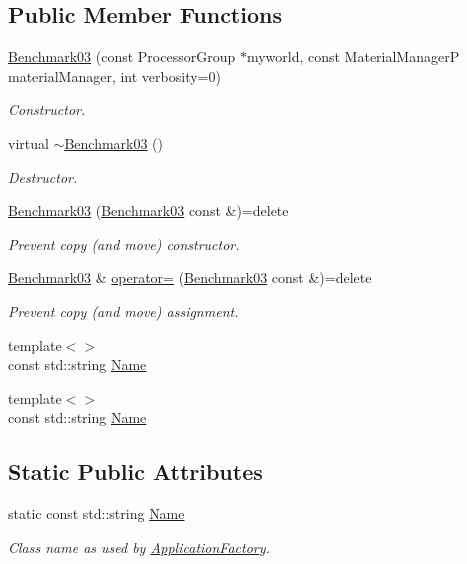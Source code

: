 \subsection*{Public Member Functions}
\begin{DoxyCompactItemize}
\item 
\hyperlink{classUintah_1_1PhaseField_1_1Benchmark03_ad2f44d664d62ff81a6f7ec039d779c35}{Benchmark03} (const Processor\+Group $\ast$myworld, const Material\+ManagerP material\+Manager, int verbosity=0)
\begin{DoxyCompactList}\small\item\em Constructor. \end{DoxyCompactList}\item 
virtual \hyperlink{classUintah_1_1PhaseField_1_1Benchmark03_a9527212bded7f353e9376f278ab9baf4}{$\sim$\+Benchmark03} ()
\begin{DoxyCompactList}\small\item\em Destructor. \end{DoxyCompactList}\item 
\hyperlink{classUintah_1_1PhaseField_1_1Benchmark03_a07e76b7ec2c47efb2cb28dc038720b1a}{Benchmark03} (\hyperlink{classUintah_1_1PhaseField_1_1Benchmark03}{Benchmark03} const \&)=delete
\begin{DoxyCompactList}\small\item\em Prevent copy (and move) constructor. \end{DoxyCompactList}\item 
\hyperlink{classUintah_1_1PhaseField_1_1Benchmark03}{Benchmark03} \& \hyperlink{classUintah_1_1PhaseField_1_1Benchmark03_a737e2ac7671a49af4ea12c684d5c8e63}{operator=} (\hyperlink{classUintah_1_1PhaseField_1_1Benchmark03}{Benchmark03} const \&)=delete
\begin{DoxyCompactList}\small\item\em Prevent copy (and move) assignment. \end{DoxyCompactList}\item 
{\footnotesize template$<$$>$ }\\const std\+::string \hyperlink{classUintah_1_1PhaseField_1_1Benchmark03_a5af4428f49db343bf95f911607fe7a52}{Name}
\item 
{\footnotesize template$<$$>$ }\\const std\+::string \hyperlink{classUintah_1_1PhaseField_1_1Benchmark03_a5a0cc49838d8e6850bf47551196041c4}{Name}
\end{DoxyCompactItemize}
\subsection*{Static Public Attributes}
\begin{DoxyCompactItemize}
\item 
static const std\+::string \hyperlink{classUintah_1_1PhaseField_1_1Benchmark03_aab82b308863066536c21e027f2795cd3}{Name}
\begin{DoxyCompactList}\small\item\em Class name as used by \hyperlink{classUintah_1_1PhaseField_1_1ApplicationFactory}{Application\+Factory}. \end{DoxyCompactList}\end{DoxyCompactItemize}
